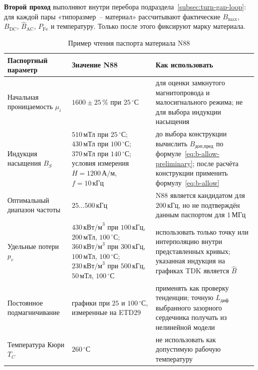 \documentclass[14pt,a4paper]{extarticle}
\begin{document}
\textbf{Второй проход} выполняют внутри перебора
подраздела~\ref{subsec:turn-gap-loop}: для каждой пары
«типоразмер~-- материал» рассчитывают фактические $B_{\max}$,
$B_{\text{DC}}$, $\widehat B_{\text{AC}}$, $P_{\text{Fe}}$ и
температуру. Только после этого фиксируют марку материала.

\begin{table}[H]
\caption{Пример чтения паспорта материала N88}
\label{tab:n88-datasheet-example}
\centering
\scriptsize
\begin{tabularx}{\textwidth}{>{\raggedright\arraybackslash}p{39mm}
>{\raggedright\arraybackslash}p{49mm} X}
\toprule
Паспортный параметр & Значение N88 & Как использовать \\
\midrule
Начальная проницаемость $\mu_i$ &
$1600\pm25\,\%$ при $25\,^{\circ}\text{С}$ &
для оценки замкнутого магнитопровода и малосигнального режима; не для
выбора индукции насыщения \\
Индукция насыщения $B_S$ &
$510\,\text{мТл}$ при $25\,^{\circ}\text{С}$;
$430\,\text{мТл}$ при $100\,^{\circ}\text{С}$;
$370\,\text{мТл}$ при $140\,^{\circ}\text{С}$;
условия измерения $H=1200\,\text{А/м}$, $f=10\,\text{кГц}$ &
до выбора конструкции вычислить $B_{\text{доп,пред}}$ по
формуле~\eqref{eq:b-allow-preliminary}; после расчёта конструкции
применить формулу~\eqref{eq:b-allow} \\
Оптимальный диапазон частоты &
$25\ldots500\,\text{кГц}$ &
N88 является кандидатом для $200\,\text{кГц}$, но не подтверждён данным
паспортом для $1\,\text{МГц}$ \\
Удельные потери $p_v$ &
$430\,\text{кВт/м}^3$ при $100\,\text{кГц}$,
$200\,\text{мТл}$, $100\,^{\circ}\text{С}$;
$360\,\text{кВт/м}^3$ при $300\,\text{кГц}$,
$100\,\text{мТл}$, $100\,^{\circ}\text{С}$;
$230\,\text{кВт/м}^3$ при $500\,\text{кГц}$,
$50\,\text{мТл}$, $100\,^{\circ}\text{С}$ &
использовать только точку или интерполяцию внутри представленных кривых;
указанная индукция на графиках TDK является $\widehat B$ \\
Постоянное подмагничивание &
графики при $25$ и $100\,^{\circ}\text{С}$, измеренные на ETD29 &
применять как проверку тенденции; точную $L_{\text{диф}}$ выбранного
зазорного сердечника получать из нелинейной модели \\
Температура Кюри $T_C$ & $260\,^{\circ}\text{С}$ &
не использовать как допустимую рабочую температуру \\
\bottomrule
\end{tabularx}
\end{table}
\end{document}
